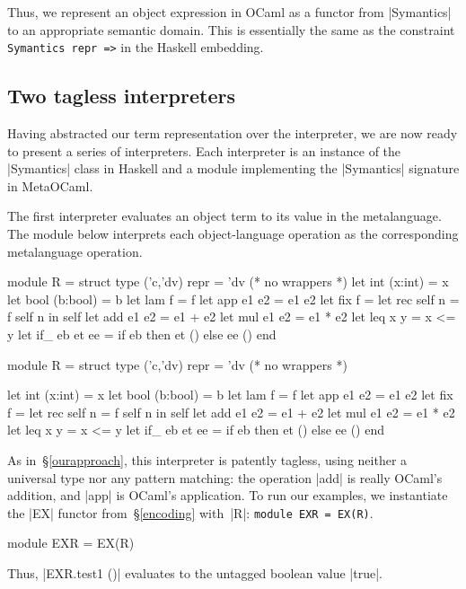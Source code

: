 Thus, we represent an object expression in
OCaml as a functor from |Symantics| to an appropriate semantic domain. This
is essentially the same as the constraint \texttt{Symantics repr =>} in the
Haskell embedding.

\subsection{Two tagless interpreters}
\label{S:interpreter-RL}

Having abstracted our term representation over the interpreter, we are
now ready to present a series of interpreters.  Each interpreter is an
instance of the |Symantics| class in Haskell and a module implementing
the |Symantics| signature in MetaOCaml.

The first interpreter evaluates an object term to its value in the
metalanguage.  The module below interprets each object\hyp language
operation as the corresponding metalanguage operation.
\ifshort
\vspace*{-0.8em}\begin{code3}
module R = struct type ('c,'dv) repr = 'dv (* no wrappers *)
  let int  (x:int)  = x         let bool (b:bool) = b
  let lam  f        = f         let app  e1 e2    = e1 e2
  let fix  f        = let rec self n = f self n in self
  let add  e1 e2    = e1 + e2   let mul  e1 e2    = e1 * e2
  let leq  x y      = x <= y
  let if_  eb et ee = if eb then et () else ee () end
\end{code3}
\vspace*{-0.8em}
\else
\begin{code}
module R = struct
  type ('c,'dv) repr = 'dv (* no wrappers *)

  let int  (x:int)  = x
  let bool (b:bool) = b
  let lam  f        = f
  let app  e1 e2    = e1 e2
  let fix  f        = let rec self n = f self n in self
  let add  e1 e2    = e1 + e2
  let mul  e1 e2    = e1 * e2
  let leq  x y      = x <= y
  let if_  eb et ee = if eb then et () else ee ()
end
\end{code}
\fi
%
As in~\S\ref{ourapproach},
this interpreter is patently tagless, using neither a universal type nor
any pattern matching: the operation |add| is really
OCaml's addition, and |app| is OCaml's application. To run our
examples, we instantiate the |EX| functor from~\S\ref{encoding}
with~|R|\ifshort: \texttt{module EXR = EX(R)}\fi.
\ifshort\else
\begin{code}
module EXR = EX(R)
\end{code}
\fi
Thus, |EXR.test1 ()| evaluates to the untagged boolean value |true|.
